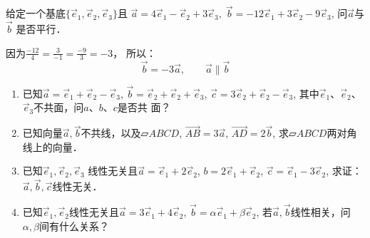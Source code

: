\begin{example}
    给定一个基底$\{\vec{e}_1,\vec{e}_2,\vec{e}_3\}$且
$\vec{a}=4\vec{e}_1-\vec{e}_2+3\vec{e}_3,\; \vec{b}=-12\vec{e}_1+3\vec{e}_2-9\vec{e}_3$, 问$\vec{a}$与$\vec{b}$
是否平行．
\end{example}

\begin{solution}
因为$\frac{-12}{4}=\frac{3}{-1}=\frac{-9}{3}=-3$，
所以：
\[\vec{b}=-3\vec{a},\qquad \vec{a}\parallel \vec{b}\]    
\end{solution}

\begin{ex}
\begin{enumerate}
    \item 已知$\vec{a}=\vec{e}_1+\vec{e}_2-\vec{e}_3$, $\vec{b}=\vec{e}_2+\vec{e}_2+\vec{e}_3$, $\vec{c} =3\vec{e}_2+\vec{e}_2-\vec{e}_3$, 其中$\vec{e}_1$、$\vec{e}_2$、$\vec{e}_3$不共面，问$a$、$b$、$c$是否共
    面？
    \item     已知向量$\vec{a},\vec{b}$不共线，以及$\parallelogram{}ABCD$, $\Vec{AB}=3\vec{a}$, $\Vec{AD}=2\vec{b}$, 求$\parallelogram{}ABCD$两对角线上的向量．
  \item 已知$\vec{e}_1,\vec{e}_2,\vec{e}_3$
    线性无关且$\vec{a}=\vec{e}_1+2\vec{e}_2$, $b=2\vec{e}_1+\vec{e}_2$, 
    $\vec{c}=\vec{e}_1-3\vec{e}_2$, 求证：$\vec{a},\vec{b},\vec{c}$线性无关．
    \item  已知$\vec{e}_1,\vec{e}_2$线性无关且$\vec{a}=3\vec{e}_1+4\vec{e}_2$, $\vec{b}=\alpha\vec{e}_1+\beta \vec{e}_2$, 若$\vec{a}, \vec{b}$线性相关，问$\alpha,\beta$间有什么关系？
    

\end{enumerate}
\end{ex}
